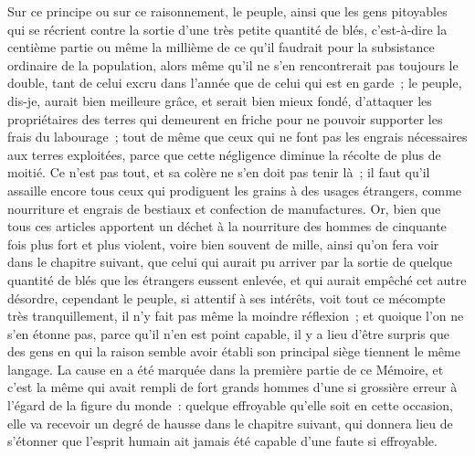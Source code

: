 \documentclass[french,twoside]{book} %
\begin{document}
Sur ce principe ou sur ce raisonnement, le peuple, ainsi que les gens pitoyables qui se récrient contre la sortie d’une très petite quantité de blés, c’est-à-dire la centième partie ou même la millième de ce qu’il faudrait pour la subsistance ordinaire de la population, alors même qu’il ne s’en rencontrerait pas toujours le double, tant de celui excru dans l’année que de celui qui est en garde ; le peuple, dis-je, aurait bien meilleure grâce, et serait bien mieux fondé, d’attaquer les propriétaires des terres qui demeurent en friche pour ne pouvoir supporter les frais du labourage ; tout de même que ceux qui ne font pas les engrais nécessaires aux terres exploitées, parce que cette négligence diminue la récolte de plus de moitié. Ce n’est pas tout, et sa colère ne s’en doit pas tenir là ; il faut qu’il assaille encore tous ceux qui prodiguent les grains à des usages étrangers, comme nourriture et engrais de bestiaux et confection de manufactures. Or, bien que tous ces articles apportent un déchet à la nourriture des hommes de cinquante fois plus fort et plus violent, voire bien souvent de mille, ainsi qu’on fera voir dans le chapitre suivant, que celui qui aurait pu arriver par la sortie de quelque quantité de blés que les étrangers eussent enlevée, et qui aurait empêché cet autre désordre, cependant le peuple, si attentif à ses intérêts, voit tout ce mécompte très tranquillement, il n’y fait pas même la moindre réflexion ; et quoique l’on ne s’en étonne pas, parce qu’il n’en est point capable, il y a lieu d’être surpris que des gens en qui la raison semble avoir établi son principal siège tiennent le même langage. La cause en a été marquée dans la première partie de ce Mémoire, et c’est la même qui avait rempli de fort grands hommes d’une si grossière erreur à l’égard de la figure du monde : quelque effroyable qu’elle soit en cette occasion, elle va recevoir un degré de hausse dans le chapitre suivant, qui donnera lieu de s’étonner que l’esprit humain ait jamais été capable d’une faute si effroyable.
\end{document}
